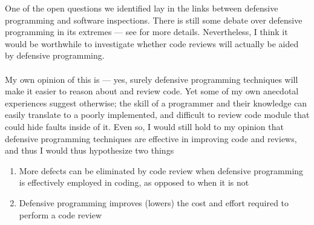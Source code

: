 One of the open questions we identified lay in the links between defensive programming and software
inspections.
There is still some debate over defensive programming in its extremes --- see
\cite{roop2009defensive} for more details.
Nevertheless, I think it would be worthwhile to investigate whether code reviews will actually be
aided by defensive programming.\\
\\
My own opinion of this is --- yes, surely defensive programming techniques will make it easier to
reason about and review code.
Yet some of my own anecdotal experiences suggest otherwise; the skill of a programmer and their
knowledge can easily translate to a poorly implemented, and difficult to review code module that
could hide faults inside of it.
Even so, I would still hold to my opinion that defensive programming techniques are effective in
improving code and reviews, and thus I would thus hypothesize two things
\begin{enumerate}
	\item More defects can be eliminated by code review when defensive programming is effectively employed in coding,
		as opposed to when it is not
	\item Defensive programming improves (lowers) the cost and effort required to perform a code review
\end{enumerate}

